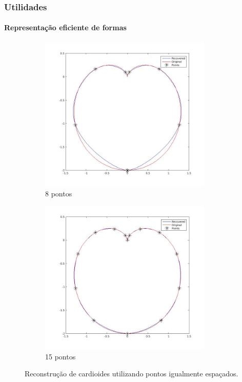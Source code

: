 \begin{frame}
	\frametitle{Utilidades}
	\framesubtitle{Representação eficiente de formas}
	\begin{figure}
		\centering
		\begin{subfigure}[b]{0.49\textwidth}
			\centering
			\includegraphics[width=0.9\textwidth]{img/cardioide8.jpg}
			\caption{8 pontos}
			\label{fig:car8}
		\end{subfigure}
		\hfill
		\begin{subfigure}[b]{0.49\textwidth}
			\centering
			\includegraphics[width=0.9\textwidth]{img/cardioide15.jpg}
			\caption{15 pontos}
			\label{fig:car15}
		\end{subfigure}
		\caption{Reconstrução de cardioides utilizando pontos igualmente espaçados.}
	\end{figure}
\end{frame}

